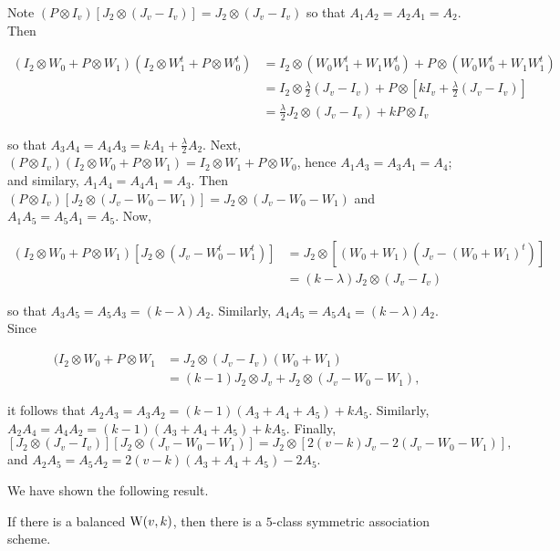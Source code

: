 \documentclass[../../../main]{subfiles}
\begin{document}
 Note $(P \otimes I_v)[J_2 \otimes (J_v-I_v)] = J_2 \otimes (J_v-I_v)$ so that $A_1A_2=A_2A_1=A_2$. Then 
 \begin{small}
 \begin{align*}
  (I_2 \otimes W_0 + P \otimes W_1)(I_2 \otimes W_1^t + P \otimes W_0^t) &= I_2 \otimes (W_0W_1^t + W_1W_0^t) + P \otimes (W_0W_0^t + W_1W_1^t) \\
  &= I_2 \otimes \frac{\lambda}{2}(J_v-I_v) + P \otimes [kI_v + \frac{\lambda}{2}(J_v-I_v)] \\
  &= \frac{\lambda}{2}J_2 \otimes (J_v-I_v) + kP \otimes I_v
 \end{align*}
 \end{small}
 so that $A_3A_4 = A_4A_3 = kA_1 + \frac{\lambda}{2}A_2$. Next, $(P \otimes I_v)(I_2 \otimes W_0 + P \otimes W_1) = I_2 \otimes W_1 + P \otimes W_0$, hence $A_1A_3=A_3A_1=A_4$; and similary, $A_1A_4=A_4A_1=A_3$. Then $(P \otimes I_v)[J_2 \otimes (J_v-W_0-W_1)] = J_2 \otimes (J_v-W_0-W_1)$ and $A_1A_5=A_5A_1=A_5$. Now,
 \begin{small}
 \begin{align*}
  (I_2 \otimes W_0 + P \otimes W_1)[J_2 \otimes (J_v-W_0^t-W_1^t)] &= J_2 \otimes [(W_0+W_1)(J_v-(W_0+W_1)^t)] \\
  &= (k-\lambda) J_2 \otimes (J_v-I_v)
 \end{align*}
 \end{small}
 so that $A_3A_5 = A_5A_3 = (k-\lambda)A_2$. Similarly, $A_4A_5 = A_5A_4 = (k-\lambda)A_2$. Since
 \begin{small}
 \begin{align*}
  [J_2 \otimes (J_v-I_v)](I_2 \otimes W_0 + P \otimes W_1 &= J_2 \otimes (J_v-I_v)(W_0+W_1) \\
  &= (k-1)J_2 \otimes J_v + J_2 \otimes (J_v-W_0-W_1),
 \end{align*}
 \end{small}
 it follows that $A_2A_3=A_3A_2 = (k-1)(A_3+A_4+A_5)+kA_5$. Similarly, $A_2A_4=A_4A_2 = (k-1)(A_3+A_4+A_5)+kA_5$.
 Finally, 
 \[
  [J_2 \otimes (J_v-I_v)][J_2 \otimes (J_v-W_0-W_1)] = J_2 \otimes [2(v-k)J_v - 2(J_v-W_0-W_1)],
 \]
 and $A_2A_5 = A_5A_2 = 2(v-k)(A_3+A_4+A_5) - 2A_5$.
 
 We have shown the following result.
 
 \begin{thm}\label{weighing -scheme-existence}
  If there is a balanced $\text{W}(v,k)$, then there is a $5$-class symmetric association scheme.
 \end{thm}
 
\end{document}

